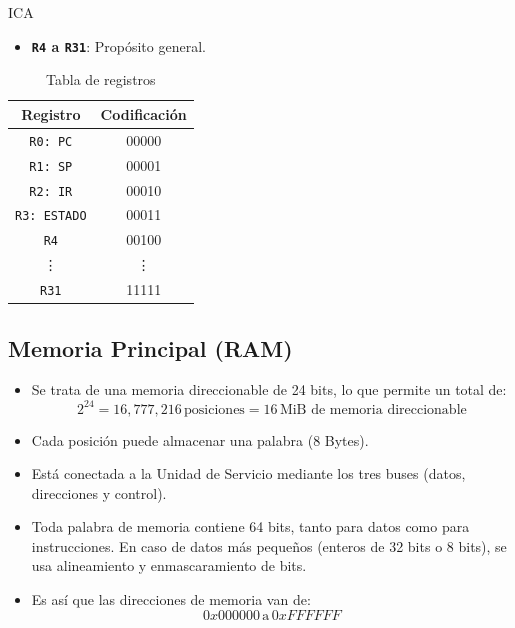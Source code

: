 ICA\documentclass{article}
\begin{document}
\begin{itemize}
  \item \textbf{\texttt{R4} a \texttt{R31}}: Propósito general.
\end{itemize}

\begin{table}[H]
  \centering
  \begin{tabular}{|c|c|}
    \hline
    \textbf{Registro}   & \textbf{Codificación} \\
    \hline
    \texttt{R0: PC}     & 00000                 \\
    \texttt{R1: SP}     & 00001                 \\
    \texttt{R2: IR}     & 00010                 \\
    \texttt{R3: ESTADO} & 00011                 \\
    \texttt{R4}         & 00100                 \\
    \vdots              & \vdots                \\
    \texttt{R31}        & 11111                 \\
    \hline
  \end{tabular}
  \caption{Tabla de registros}
\end{table}

\subsection{Memoria Principal (RAM)}

\begin{itemize}
  \item Se trata de una memoria direccionable de 24 bits, lo que permite un total de:
        \[
          2^{24} = 16,777,216 \, \text{posiciones} = 16 \, \text{MiB de memoria direccionable}
        \]
  \item Cada posición puede almacenar una palabra (8 Bytes).
  \item Está conectada a la Unidad de Servicio mediante los tres buses (datos, direcciones y control).
  \item Toda palabra de memoria contiene 64 bits, tanto para datos como para instrucciones. En caso de datos más pequeños (enteros de 32 bits o 8 bits), se usa alineamiento y enmascaramiento de bits.
  \item Es así que las direcciones de memoria van de:
        \[
          0x000000 \, \text{a} \, 0xFFFFFF
        \]
\end{itemize}
\end{document}
